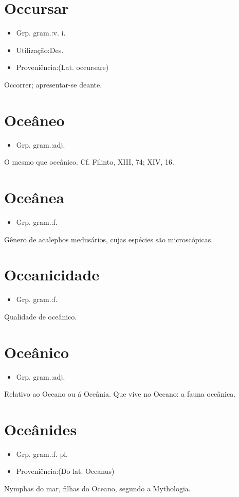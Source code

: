 \section{Occursar}
\begin{itemize}
\item {Grp. gram.:v. i.}
\end{itemize}
\begin{itemize}
\item {Utilização:Des.}
\end{itemize}
\begin{itemize}
\item {Proveniência:(Lat. \textunderscore occursare\textunderscore )}
\end{itemize}
Occorrer; apresentar-se deante.
\section{Oceâneo}
\begin{itemize}
\item {Grp. gram.:adj.}
\end{itemize}
O mesmo que \textunderscore oceânico\textunderscore . Cf. Filinto, XIII, 74; XIV, 16.
\section{Oceânea}
\begin{itemize}
\item {Grp. gram.:f.}
\end{itemize}
Gênero de acalephos medusários, cujas espécies são microscópicas.
\section{Oceanicidade}
\begin{itemize}
\item {Grp. gram.:f.}
\end{itemize}
Qualidade de oceânico.
\section{Oceânico}
\begin{itemize}
\item {Grp. gram.:adj.}
\end{itemize}
Relativo ao Oceano ou á Oceânia.
Que vive no Oceano: \textunderscore a fauna oceânica\textunderscore .
\section{Oceânides}
\begin{itemize}
\item {Grp. gram.:f. pl.}
\end{itemize}
\begin{itemize}
\item {Proveniência:(Do lat. \textunderscore Oceanus\textunderscore )}
\end{itemize}
Nymphas do mar, filhas do Oceano, segundo a Mythologia.
